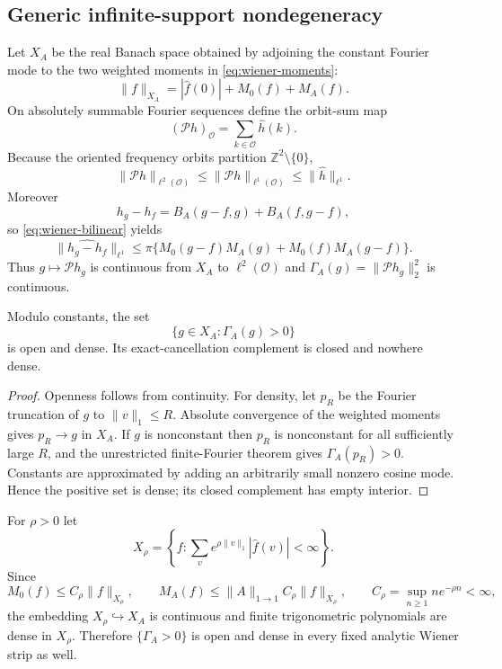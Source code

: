 \subsection{Generic infinite-support nondegeneracy}
Let $X_A$ be the real Banach space obtained by adjoining the constant Fourier
mode to the two weighted moments in \eqref{eq:wiener-moments}:
\[
 \|f\|_{X_A}=|\widehat f(0)|+M_0(f)+M_A(f).
\]
On absolutely summable Fourier sequences define the orbit-sum map
\[
 (\mathcal Ph)_{\mathcal O}=\sum_{k\in\mathcal O}\widehat h(k).
\]
Because the oriented frequency orbits partition $\mathbb Z^2\setminus\{0\}$,
\begin{equation}\label{eq:wiener-orbit-cont}
 \|\mathcal Ph\|_{\ell^2(\mathcal O)}
 \leq\|\mathcal Ph\|_{\ell^1(\mathcal O)}
 \leq\|\widehat h\|_{\ell^1}.
\end{equation}
Moreover
\[
 h_g-h_f=B_A(g-f,g)+B_A(f,g-f),
\]
so \eqref{eq:wiener-bilinear} yields
\begin{equation}\label{eq:wiener-gamma-cont}
 \|\widehat{h_g-h_f}\|_{\ell^1}
 \leq\pi\{M_0(g-f)M_A(g)+M_0(f)M_A(g-f)\}.
\end{equation}
Thus $g\mapsto\mathcal Ph_g$ is continuous from $X_A$ to
$\ell^2(\mathcal O)$ and
$\Gamma_A(g)=\|\mathcal Ph_g\|_2^2$ is continuous.

\begin{theorem}
\label{thm:wiener-generic}
Modulo constants, the set
\[
 \{g\in X_A:\Gamma_A(g)>0\}
\]
is open and dense.  Its exact-cancellation complement is closed and nowhere
dense.
\end{theorem}
\begin{proof}
Openness follows from continuity.  For density, let $p_R$ be the Fourier
truncation of $g$ to $\|v\|_1\leq R$.  Absolute convergence of the weighted
moments gives $p_R\to g$ in $X_A$.  If $g$ is nonconstant then $p_R$ is
nonconstant for all sufficiently large $R$, and the unrestricted
finite-Fourier theorem gives $\Gamma_A(p_R)>0$.  Constants are approximated by
adding an arbitrarily small nonzero cosine mode.  Hence the positive set is
dense; its closed complement has empty interior.
\end{proof}

For $\rho>0$ let
\[
 X_\rho=\left\{f:\sum_v e^{\rho\|v\|_1}|\widehat f(v)|<\infty\right\}.
\]
Since
\[
 M_0(f)\leq C_\rho\|f\|_{X_\rho},\qquad
 M_A(f)\leq\|A\|_{1\to1}C_\rho\|f\|_{X_\rho},\qquad
 C_\rho=\sup_{n\ge1}ne^{-\rho n}<\infty,
\]
the embedding $X_\rho\hookrightarrow X_A$ is continuous and finite
trigonometric polynomials are dense in $X_\rho$.  Therefore
$\{\Gamma_A>0\}$ is open and dense in every fixed analytic Wiener strip as
well.

